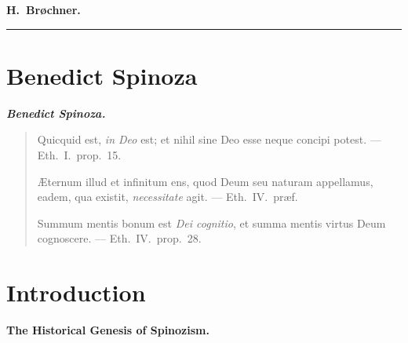 \documentclass[12pt,a4paper,openany]{book}
\newcommand{\opage}[1]{\marginnote{\footnotesize\textit{[#1]}}}
\begin{document}
\bigskip
\begin{flushleft}
\end{flushleft}

\begin{flushright}
{\small\textbf{H.\ Brøchner.}}\hspace{4em}
\end{flushright}

\bigskip
\begin{center}\rule{2.5cm}{0.4pt}\end{center}

\newpage

\chapter*{Benedict Spinoza}
\opage{15}

\begin{center}
{\Large\textbf{\emph{Benedict Spinoza.}}}
\end{center}

\vspace{2\baselineskip}

\begingroup
{}
\begin{quote}
\small
Quicquid est, \emph{in Deo} est; et nihil sine Deo esse neque concipi
potest. --- Eth.\ I.\ prop.\ 15.

\medskip

Æternum illud et infinitum ens, quod Deum seu naturam appellamus, eadem,
qua existit, \emph{necessitate} agit. --- Eth.\ IV.\ præf.

\medskip

Summum mentis bonum est \emph{Dei cognitio}, et summa mentis virtus Deum
cognoscere. --- Eth.\ IV.\ prop.\ 28.
\end{quote}
\endgroup

\opage{16}

\newpage

\chapter*{Introduction}

\begin{center}
\textbf{The Historical Genesis of Spinozism.}
\end{center}
\end{document}
